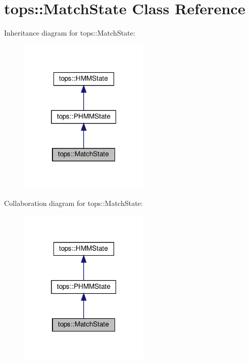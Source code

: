 \hypertarget{classtops_1_1MatchState}{}\section{tops\+:\+:Match\+State Class Reference}
\label{classtops_1_1MatchState}


Inheritance diagram for tops\+:\+:Match\+State\+:
\nopagebreak
\begin{figure}[H]
\begin{center}
\leavevmode
\includegraphics[width=175pt]{classtops_1_1MatchState__inherit__graph}
\end{center}
\end{figure}


Collaboration diagram for tops\+:\+:Match\+State\+:
\nopagebreak
\begin{figure}[H]
\begin{center}
\leavevmode
\includegraphics[width=175pt]{classtops_1_1MatchState__coll__graph}
\end{center}
\end{figure}
